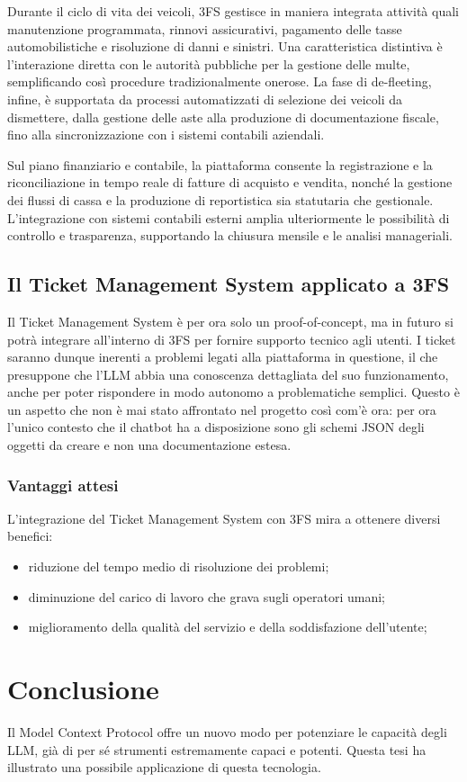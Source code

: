Durante il ciclo di vita dei veicoli, 3FS{\textsuperscript{\tiny\textcopyright}} gestisce in maniera integrata attività quali manutenzione programmata, rinnovi assicurativi,
pagamento delle tasse automobilistiche e risoluzione di danni e sinistri. Una caratteristica distintiva è l'interazione diretta con le autorità
pubbliche per la gestione delle multe, semplificando così procedure tradizionalmente onerose. La fase di de-fleeting, infine, è supportata
da processi automatizzati di selezione dei veicoli da dismettere, dalla gestione delle aste alla produzione di documentazione fiscale, fino
alla sincronizzazione con i sistemi contabili aziendali.

Sul piano finanziario e contabile, la piattaforma consente la registrazione e la riconciliazione in tempo reale di fatture di acquisto e vendita,
nonché la gestione dei flussi di cassa e la produzione di reportistica sia statutaria che gestionale. L'integrazione con sistemi contabili esterni
amplia ulteriormente le possibilità di controllo e trasparenza, supportando la chiusura mensile e le analisi manageriali. \cite{progesoftware_3fs}

\subsection{\texorpdfstring{Il Ticket Management System applicato a 3FS{\textsuperscript{\tiny\textcopyright}}}{Il Ticket Management System applicato a 3FS (c)}}
Il Ticket Management System è per ora solo un proof-of-concept, ma in futuro si potrà integrare all'interno di 3FS{\textsuperscript{\tiny\textcopyright}} per fornire supporto tecnico agli utenti.
I ticket saranno dunque inerenti a problemi legati alla piattaforma in questione, il che presuppone che l'LLM abbia una conoscenza dettagliata del suo funzionamento,
anche per poter rispondere in modo autonomo a problematiche semplici.
Questo è un aspetto che non è mai stato affrontato nel progetto così com'è ora: per ora l'unico contesto che il chatbot ha a disposizione sono gli schemi JSON degli oggetti
da creare e non una documentazione estesa.

\subsubsection{Vantaggi attesi}
L'integrazione del Ticket Management System con 3FS{\textsuperscript{\tiny\textcopyright}} mira a ottenere diversi benefici:
\begin{itemize}
    \item riduzione del tempo medio di risoluzione dei problemi;
    \item diminuzione del carico di lavoro che grava sugli operatori umani;
    \item miglioramento della qualità del servizio e della soddisfazione dell'utente;
\end{itemize}

\newpage
\section{Conclusione}
Il Model Context Protocol offre un nuovo modo per potenziare le capacità degli LLM, già di per sé strumenti estremamente capaci e potenti.
Questa tesi ha illustrato una possibile applicazione di questa tecnologia.